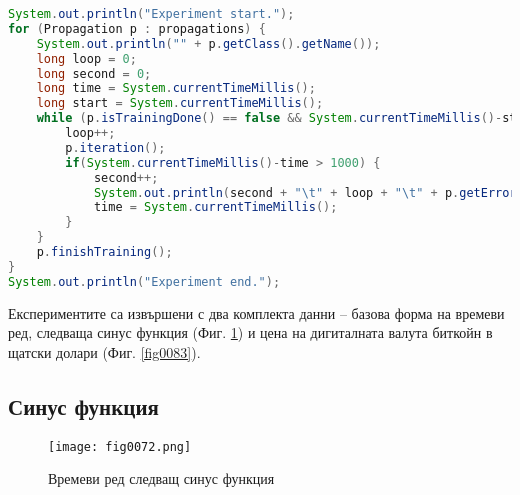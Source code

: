 \begin{lstlisting}[caption=Експериментална проверка на точните числени методи, language=Java, basicstyle=\tiny, label=list0022]
System.out.println("Experiment start.");
for (Propagation p : propagations) {
    System.out.println("" + p.getClass().getName());
    long loop = 0;
    long second = 0;
    long time = System.currentTimeMillis();
    long start = System.currentTimeMillis();
    while (p.isTrainingDone() == false && System.currentTimeMillis()-start < 1*60*1000) {
        loop++;
        p.iteration();
        if(System.currentTimeMillis()-time > 1000) {
            second++;
            System.out.println(second + "\t" + loop + "\t" + p.getError());
            time = System.currentTimeMillis();
        }
    }
    p.finishTraining();
}
System.out.println("Experiment end.");
\end{lstlisting}

Експериментите са извършени с два комплекта данни – базова форма на времеви ред, следваща синус функция (Фиг. \ref{fig0072}) и цена на дигиталната валута биткойн в щатски долари (Фиг. \ref{fig0083}). 

\subsection{Синус функция}

\begin{figure}[H]
  \centering
  \texttt{[image: fig0072.png]}
  \caption{Времеви ред следващ синус функция}
\label{fig0072}
\end{figure}

